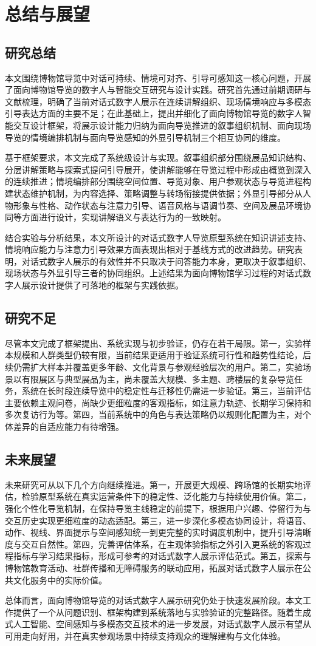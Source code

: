 \chapter*{总结与展望}

\section*{研究总结}
本文围绕博物馆导览中对话可持续、情境可对齐、引导可感知这一核心问题，开展了面向博物馆导览的数字人与智能交互研究与设计实践。研究首先通过前期调研与文献梳理，明确了当前对话式数字人展示在连续讲解组织、现场情境响应与多模态引导表达方面的主要不足；在此基础上，提出并细化了面向博物馆导览的数字人智能交互设计框架，将展示设计能力归纳为面向导览推进的叙事组织机制、面向现场导览的情境编排机制与面向导览感知的外显引导机制三个相互协同的维度。

基于框架要求，本文完成了系统级设计与实现。叙事组织部分围绕展品知识结构、分层讲解策略与探索式提问引导展开，使讲解能够在导览过程中形成由概览到深入的连续推进；情境编排部分围绕空间位置、导览对象、用户参观状态与导览进程构建状态维护机制，为内容选择、策略调整与转场衔接提供依据；外显引导部分从人物形象与性格、动作状态与注意力引导、语音风格与语调节奏、空间及展品环境协同等方面进行设计，实现讲解语义与表达行为的一致映射。

结合实验与分析结果，本文所设计的对话式数字人导览原型系统在知识讲述支持、情境响应能力与注意力引导效果方面表现出相对于基线方式的改进趋势。研究表明，对话式数字人展示的有效性并不只取决于问答能力本身，更取决于叙事组织、现场状态与外显引导三者的协同组织。上述结果为面向博物馆学习过程的对话式数字人展示设计提供了可落地的框架与实践依据。

\section*{研究不足}
尽管本文完成了框架提出、系统实现与初步验证，仍存在若干局限。第一，实验样本规模和人群类型仍较有限，当前结果更适用于验证系统可行性和趋势性结论，后续仍需扩大样本并覆盖更多年龄、文化背景与参观经验层次的用户。第二，实验场景以有限展区与典型展品为主，尚未覆盖大规模、多主题、跨楼层的复杂导览任务，系统在长时段连续导览中的稳定性与迁移性仍需进一步验证。第三，当前评估主要依赖主观问卷，尚缺少更细粒度的客观指标，如注意力轨迹、长期学习保持和多次复访行为等。第四，当前系统中的角色与表达策略仍以规则化配置为主，对个体差异的自适应能力有待增强。

\section*{未来展望}
未来研究可从以下几个方向继续推进。第一，开展更大规模、跨场馆的长期实地评估，检验原型系统在真实运营条件下的稳定性、泛化能力与持续使用价值。第二，强化个性化导览机制，在保持导览主线稳定的前提下，根据用户兴趣、停留行为与交互历史实现更细粒度的动态适配。第三，进一步深化多模态协同设计，将语音、动作、视线、界面提示与空间感知统一到更完整的实时调度机制中，提升引导清晰度与交互自然性。第四，完善评估体系，在主观体验指标之外引入更系统的客观过程指标与学习结果指标，形成可参考的对话式数字人展示评估范式。第五，探索与博物馆教育活动、社群传播和无障碍服务的联动应用，拓展对话式数字人展示在公共文化服务中的实际价值。

总体而言，面向博物馆导览的对话式数字人展示研究仍处于快速发展阶段。本文工作提供了一个从问题识别、框架构建到系统落地与实验验证的完整路径。随着生成式人工智能、空间感知与多模态交互技术的进一步发展，对话式数字人展示有望从可用走向好用，并在真实参观场景中持续支持观众的理解建构与文化体验。
